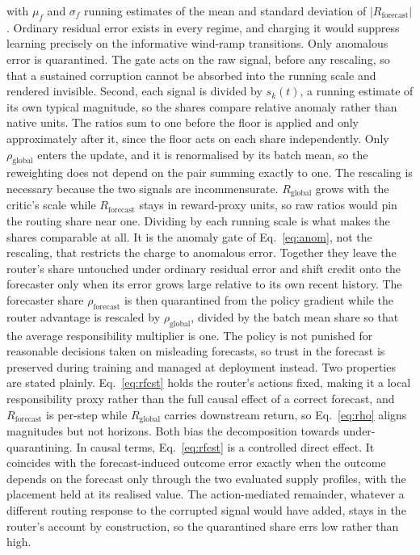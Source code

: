 \documentclass{article} %
\begin{document}
with $\mu_f$ and $\sigma_f$ running estimates of the mean and standard deviation of $|R_{\text{forecast}}|$. Ordinary residual error exists in every regime, and charging it would suppress learning precisely on the informative wind-ramp transitions. Only anomalous error is quarantined. The gate acts on the raw signal, before any rescaling, so that a sustained corruption cannot be absorbed into the running scale and rendered invisible. Second, each signal is divided by $s_k(t)$, a running estimate of its own typical magnitude, so the shares compare relative anomaly rather than native units. The ratios sum to one before the floor is applied and only approximately after it, since the floor acts on each share independently. Only $\rho_{\text{global}}$ enters the update, and it is renormalised by its batch mean, so the reweighting does not depend on the pair summing exactly to one. The rescaling is necessary because the two signals are incommensurate. $R_{\text{global}}$ grows with the critic's scale while $R_{\text{forecast}}$ stays in reward-proxy units, so raw ratios would pin the routing share near one. Dividing by each running scale is what makes the shares comparable at all. It is the anomaly gate of Eq.~\ref{eq:anom}, not the rescaling, that restricts the charge to anomalous error. Together they leave the router's share untouched under ordinary residual error and shift credit onto the forecaster only when its error grows large relative to its own recent history. The forecaster share $\rho_{\text{forecast}}$ is then quarantined from the policy gradient while the router advantage is rescaled by $\rho_{\text{global}}$, divided by the batch mean share so that the average responsibility multiplier is one. The policy is not punished for reasonable decisions taken on misleading forecasts, so trust in the forecast is preserved during training and managed at deployment instead. Two properties are stated plainly. Eq.~\ref{eq:rfcst} holds the router's actions fixed, making it a local responsibility proxy rather than the full causal effect of a correct forecast, and $R_{\text{forecast}}$ is per-step while $R_{\text{global}}$ carries downstream return, so Eq.~\ref{eq:rho} aligns magnitudes but not horizons. Both bias the decomposition towards under-quarantining. In causal terms, Eq.~\ref{eq:rfcst} is a controlled direct effect. It coincides with the forecast-induced outcome error exactly when the outcome depends on the forecast only through the two evaluated supply profiles, with the placement held at its realised value. The action-mediated remainder, whatever a different routing response to the corrupted signal would have added, stays in the router's account by construction, so the quarantined share errs low rather than high.
\end{document}
